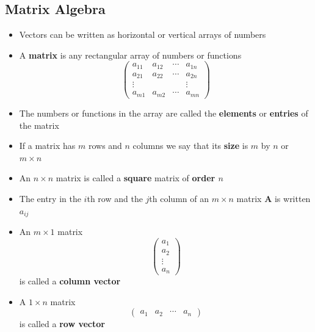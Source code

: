 \documentclass{article}
\begin{document}
\subsection{Matrix Algebra}

\begin{itemize}
  \item Vectors can be written as horizontal or vertical arrays of numbers

  \item A \textbf{matrix} is any rectangular array of numbers or functions \[\begin{pmatrix}
            a_{11} & a_{12} & \cdots & a_{1n} \\
            a_{21} & a_{22} & \cdots & a_{2n} \\
            \vdots &        &        & \vdots \\
            a_{m1} & a_{m2} & \cdots & a_{mn}
          \end{pmatrix}\]

  \item The numbers or functions in the array are called the \textbf{elements} or \textbf{entries} of the matrix

  \item If a matrix has $m$ rows and $n$ columns we say that its \textbf{size} is $m$ by $n$ or $m \times n$

  \item An $n \times n$ matrix is called a \textbf{square} matrix of \textbf{order $n$}

  \item The entry in the $i$th row and the $j$th column of an $m \times n$ matrix $\mathbf{A}$ is written $a_{ij}$

  \item An $m \times 1$ matrix \[\begin{pmatrix}
            a_1    \\
            a_2    \\
            \vdots \\
            a_n
          \end{pmatrix}\] is called a \textbf{column vector}

  \item A $1 \times n$ matrix \[\begin{pmatrix}
            a_1 & a_2 & \cdots & a_n
          \end{pmatrix}\] is called a \textbf{row vector}
\end{itemize}
\end{document}
